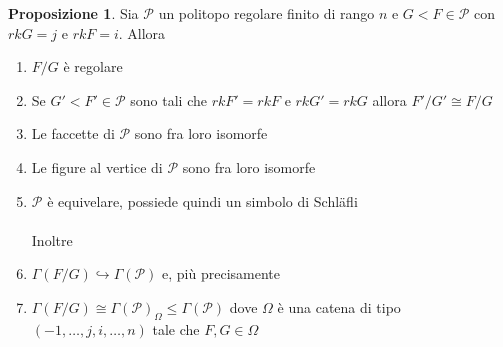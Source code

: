 \documentclass[a4paper,12pt]{report}
\newcommand{\p}{\mathcal{P}}
\theoremstyle{plain}
\theoremstyle{definition}
\newtheorem{prop}[teo]{Proposizione}
\newcommand\locallabel[1]{\label{\currentprefix_#1}}
\begin{document}
\begin{prop}
\label{prop:RegularSections}
Sia $\p$ un politopo regolare finito di rango $n$ e $G<F\in\p$ con $rkG=j$ e $rkF=i$. Allora
\begin{enumerate}
\item\locallabel{(1)} $F/G$ \`e regolare
\item\locallabel{(2)} Se $G'<F'\in\p$ sono tali che $rkF'=rkF$ e $rkG'=rkG$ allora $F'/G'\cong F/G$
\item\locallabel{(3)} Le faccette di $\p$ sono fra loro isomorfe
\item\locallabel{(4)} Le figure al vertice di $\p$ sono fra loro isomorfe
\item\locallabel{(5)} $\p$ \`e equivelare, possiede quindi un simbolo di Schl\"afli\\\\
Inoltre
\item\locallabel{(6)} $\Gamma(F/G)\hookrightarrow\Gamma(\p)$ e, pi\`u precisamente
\item\locallabel{(7)} $\Gamma(F/G)\cong \Gamma(\p)_\Omega\leq\Gamma(\p)$ dove $\Omega$ \`e una catena di tipo $(-1,\dots,j,i,\dots,n)$ tale che $F,G\in\Omega$
\end{enumerate}
\end{prop}
\end{document}
